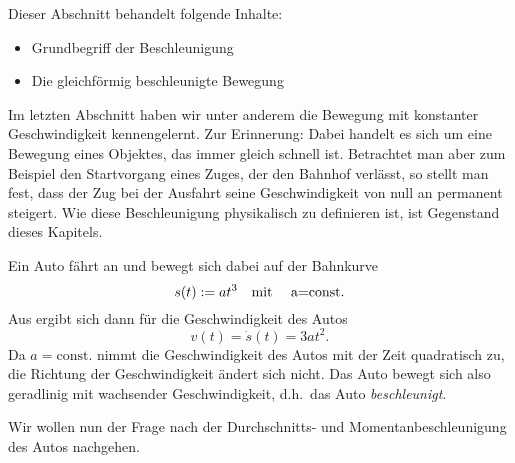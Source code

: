 
  
  \begin{MIntro} 
  
 Dieser Abschnitt behandelt folgende Inhalte:
 \begin{itemize}
 \item{Grundbegriff der Beschleunigung}
 \item{Die gleichf\"ormig beschleunigte Bewegung}
 \end{itemize} 
  
Im letzten Abschnitt haben wir unter anderem die Bewegung mit konstanter Geschwindigkeit kennengelernt. Zur Erinnerung: Dabei handelt es sich um eine Bewegung eines Objektes, das immer gleich schnell ist. Betrachtet man aber zum Beispiel den Startvorgang eines Zuges, der den Bahnhof verl\"asst, so stellt man fest, dass der Zug bei der Ausfahrt seine Geschwindigkeit von null an permanent steigert. Wie diese Beschleunigung physikalisch zu definieren ist, ist Gegenstand dieses Kapitels.


  \begin{MExample}
  Ein Auto f\"ahrt an und bewegt sich dabei auf der Bahnkurve
  \begin{equation*}
  s(t):=a t^3 \quad \text{mit \quad a=\textrm{const.}}
  \end{equation*} Aus  ergibt sich dann f\"ur die Geschwindigkeit des Autos
  \begin{equation*}
  v(t)=\dot{s}(t)=3a t^2.
  \end{equation*}
  Da $a=\textrm{const.}$ nimmt die Geschwindigkeit des Autos mit der Zeit quadratisch zu, die Richtung der Geschwindigkeit \"andert sich nicht. Das Auto bewegt sich also geradlinig mit wachsender Geschwindigkeit, d.h.~das Auto \textit{beschleunigt}.
   \end{MExample}
 
 Wir wollen nun der Frage nach der Durchschnitts- und Momentanbeschleunigung des Autos nachgehen.
 
  \end{MIntro}

